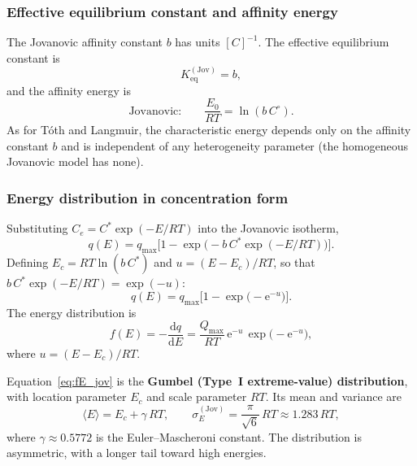 	\subsubsection{Effective equilibrium constant and affinity energy}

	The Jovanovic affinity constant $b$ has units $[C]^{-1}$. The effective
	equilibrium constant is
	\begin{equation}
		K_{\mathrm{eq}}^{\mathrm{(Jov)}} = b,
	\end{equation}
	and the affinity energy is
	\begin{equation}
		\text{Jovanovic:}\qquad
		\frac{E_0}{RT} = \ln(b\,C^\circ).
		\label{eq:E_jov}
	\end{equation}
	As for T\'oth and Langmuir, the characteristic energy depends only on
	the affinity constant $b$ and is independent of any heterogeneity
	parameter (the homogeneous Jovanovic model has none).

	\subsubsection{Energy distribution in concentration form}

	Substituting $C_e = C^{\ast}\exp(-E/RT)$ into the Jovanovic isotherm,
	\begin{equation}
		q(E) = q_{\max}\bigl[1 -
		\exp\!\bigl(-b\,C^{\ast}\exp(-E/RT)\bigr)\bigr].
	\end{equation}
	Defining $E_c = RT\ln(b\,C^{\ast})$ and $u = (E - E_c)/RT$, so that
	$b\,C^{\ast}\exp(-E/RT) = \exp(-u)$:
	\begin{equation}
		q(E) = q_{\max}\bigl[1 -
		\exp\!\bigl(-\mathrm{e}^{-u}\bigr)\bigr].
		\label{eq:qE_jov}
	\end{equation}
	The energy distribution is
	\begin{equation}
		f(E) = -\frac{\mathrm{d}q}{\mathrm{d}E}
		= \frac{Q_{\max}}{RT}\,
		\mathrm{e}^{-u}\,
		\exp\!\bigl(-\mathrm{e}^{-u}\bigr),
		\label{eq:fE_jov}
	\end{equation}
	where $u = (E - E_c)/RT$.

	Equation~\eqref{eq:fE_jov} is the \textbf{Gumbel (Type~I
	extreme-value) distribution}, with location parameter $E_c$ and scale
	parameter $RT$. Its mean and variance are
	\begin{equation}
		\langle E \rangle = E_c + \gamma\,RT,
		\qquad
		\sigma_E^{\mathrm{(Jov)}}
		= \frac{\pi}{\sqrt{6}}\,RT
		\approx 1.283\,RT,
		\label{eq:sigmaE_jov}
	\end{equation}
	where $\gamma \approx 0.5772$ is the Euler--Mascheroni constant. The
	distribution is asymmetric, with a longer tail toward high energies.

